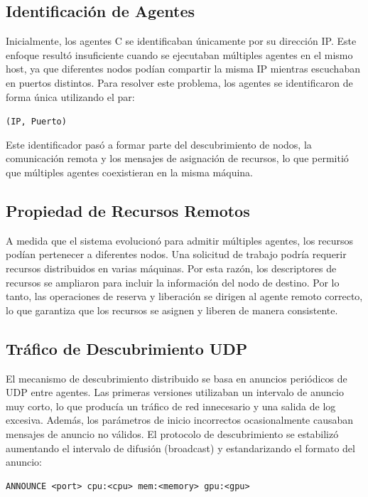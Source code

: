 \documentclass[12pt,a4paper]{article}
\begin{document}
\subsection{Identificación de Agentes}

Inicialmente, los agentes C se identificaban únicamente por su dirección IP. Este enfoque resultó insuficiente cuando se ejecutaban múltiples agentes en el mismo host, ya que diferentes nodos podían compartir la misma IP mientras escuchaban en puertos distintos. Para resolver este problema, los agentes se identificaron de forma única utilizando el par:

\begin{center}
\texttt{(IP, Puerto)}
\end{center}

Este identificador pasó a formar parte del descubrimiento de nodos, la comunicación remota y los mensajes de asignación de recursos, lo que permitió que múltiples agentes coexistieran en la misma máquina.

\subsection{Propiedad de Recursos Remotos}

A medida que el sistema evolucionó para admitir múltiples agentes, los recursos podían pertenecer a diferentes nodos. Una solicitud de trabajo podría requerir recursos distribuidos en varias máquinas. Por esta razón, los descriptores de recursos se ampliaron para incluir la información del nodo de destino. Por lo tanto, las operaciones de reserva y liberación se dirigen al agente remoto correcto, lo que garantiza que los recursos se asignen y liberen de manera consistente.

\subsection{Tráfico de Descubrimiento UDP}

El mecanismo de descubrimiento distribuido se basa en anuncios periódicos de UDP entre agentes. Las primeras versiones utilizaban un intervalo de anuncio muy corto, lo que producía un tráfico de red innecesario y una salida de log excesiva. Además, los parámetros de inicio incorrectos ocasionalmente causaban mensajes de anuncio no válidos. El protocolo de descubrimiento se estabilizó aumentando el intervalo de difusión (broadcast) y estandarizando el formato del anuncio:

\begin{lstlisting}
ANNOUNCE <port> cpu:<cpu> mem:<memory> gpu:<gpu>
\end{lstlisting}
\end{document}
